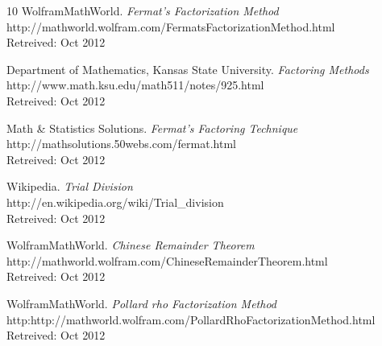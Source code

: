 \documentclass[a4paper, 12pt]{report}
\begin{document}
\begin{thebibliography} {10}
	WolframMathWorld.
	\emph{Fermat's Factorization Method} \\
	http://mathworld.wolfram.com/FermatsFactorizationMethod.html \\
	Retreived: Oct 2012
	
	Department of Mathematics, Kansas State University.
	\emph{Factoring Methods} \\
	http://www.math.ksu.edu/math511/notes/925.html \\
	Retreived: Oct 2012
	
	Math \& Statistics Solutions.
	\emph{Fermat's Factoring Technique} \\
	http://mathsolutions.50webs.com/fermat.html \\
	Retreived: Oct 2012

	Wikipedia.
	\emph{Trial Division} \\
	http://en.wikipedia.org/wiki/Trial\_division \\
	Retreived: Oct 2012

	WolframMathWorld.
	\emph{Chinese Remainder Theorem} \\
	http://mathworld.wolfram.com/ChineseRemainderTheorem.html \\
	Retreived: Oct 2012

	WolframMathWorld.
	\emph{Pollard rho Factorization Method} \\
	http:http://mathworld.wolfram.com/PollardRhoFactorizationMethod.html \\
	Retreived: Oct 2012
\end{thebibliography}
\end{document}
